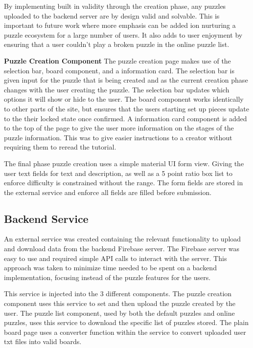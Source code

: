 \documentclass{l4proj}
\begin{document}
By implementing built in validity through the creation phase, any puzzles uploaded to the backend server are by design valid and solvable. This is important to future work where more emphasis can be added ion nurturing a puzzle ecosystem for a large number of users. It also adds to user enjoyment by ensuring that a user couldn't play a broken puzzle in the online puzzle list.

\textbf{Puzzle Creation Component}
The puzzle creation page makes use of the selection bar, board component, and a information card. The selection bar is given input for the puzzle that is being created and as the current creation phase changes with the user creating the puzzle. The selection bar updates which options it will show or hide to the user. The board component works identically to other parts of the site, but ensures that the users starting set up pieces update to the their locked state once confirmed. A information card component is added to the top of the page to give the user more information on the stages of the puzzle information. This was to give easier instructions to a creator without requiring them to reread the tutorial. 

The final phase puzzle creation uses a simple material UI form view. Giving the user text fields for text and description, as well as a 5 point ratio box list to enforce difficulty is constrained without the range. The form fields are stored in the external service and enforce all fields are filled before submission.

\subsection{Backend Service}
An external service was created containing the relevant functionality to upload and download data from the backend Firebase server. The Firebase server was easy to use and required simple API calls to interact with the server. This approach was taken to minimize time needed to be spent on a backend implementation, focusing instead of the puzzle features for the users. 

This service is injected into the 3 different components. The puzzle creation component uses this service to set and then upload the puzzle created by the user. The puzzle list component, used by both the default puzzles and online puzzles, uses this service to download the specific list of puzzles stored. The plain board page uses a converter function within the service to convert uploaded user txt files into valid boards.
\end{document}
